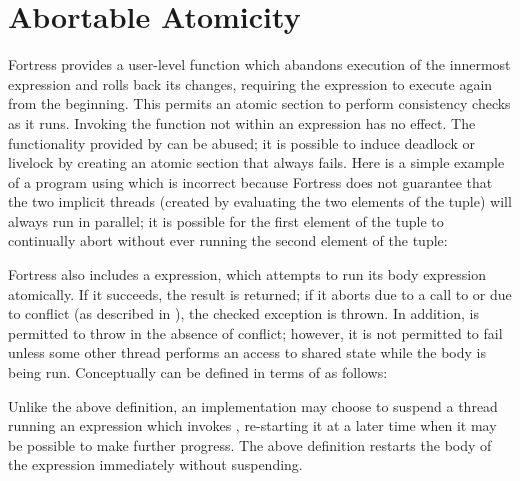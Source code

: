 %
%
%
%

\section{Abortable Atomicity}

Fortress provides a user-level  function which
abandons execution of the innermost  expression and rolls back its
changes, requiring the  expression to execute again from
the beginning.  This permits an atomic section to perform consistency
checks as it runs.
Invoking the  function not within an  expression has
no effect.
The functionality provided by
 can be abused; it is possible to induce deadlock
or livelock by creating an atomic section that always fails.  Here is
a simple example of a program using  which is
incorrect because Fortress does not guarantee that the two implicit
threads (created by evaluating the two elements of the tuple) will
always run in parallel; it is possible for the first element of the
tuple to continually abort without ever running the second element of
the tuple:

Fortress also includes a  expression, which attempts to
run its body expression atomically.  If it succeeds, the result is returned;
if it aborts due to a call to  or due to conflict
(as described in ),
the checked exception  is thrown.  In addition,  is permitted to throw  in the absence of conflict; however, it is not permitted to fail unless some other thread performs an access to shared state while the body is being run.
Conceptually  can be defined in terms of  as follows:

Unlike the above definition, an implementation may choose to suspend a
thread running an  expression which invokes ,
re-starting it at a later time when it may be possible to make further
progress.  The above definition restarts the body of the 
expression immediately without suspending.
